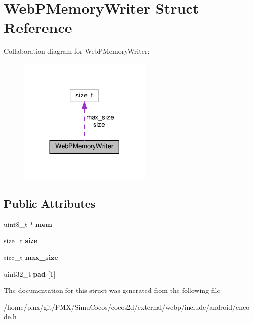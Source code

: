 \hypertarget{structWebPMemoryWriter}{}\section{Web\+P\+Memory\+Writer Struct Reference}
\label{structWebPMemoryWriter}


Collaboration diagram for Web\+P\+Memory\+Writer\+:
\nopagebreak
\begin{figure}[H]
\begin{center}
\leavevmode
\includegraphics[width=185pt]{structWebPMemoryWriter__coll__graph}
\end{center}
\end{figure}
\subsection*{Public Attributes}
\begin{DoxyCompactItemize}
\item 
\mbox{\label{structWebPMemoryWriter_a3f43b5e25452fa5034aa787b5ac50643}} 
uint8\+\_\+t $\ast$ {\bfseries mem}
\item 
\mbox{\label{structWebPMemoryWriter_abb6a286f7321da4b4abfbb7fa47945c3}} 
size\+\_\+t {\bfseries size}
\item 
\mbox{\label{structWebPMemoryWriter_a3276b78b5585ae6196f84477b9c5b25f}} 
size\+\_\+t {\bfseries max\+\_\+size}
\item 
\mbox{\label{structWebPMemoryWriter_a235f7e1830b51039f9ed5e9d7eba82f5}} 
uint32\+\_\+t {\bfseries pad} \mbox{[}1\mbox{]}
\end{DoxyCompactItemize}


The documentation for this struct was generated from the following file\+:\begin{DoxyCompactItemize}
\item 
/home/pmx/git/\+P\+M\+X/\+Simu\+Cocos/cocos2d/external/webp/include/android/encode.\+h\end{DoxyCompactItemize}
